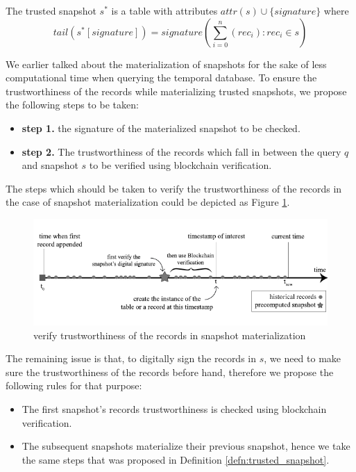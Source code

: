 			\begin{defn} 
				The trusted snapshot $s^*$ is a table with attributes $attr(s)\cup \{signature\}$ where $$tail(s^*[signature]) = signature(\sum_{i=0}^n (rec_i):rec_i \in s)$$
			\label{defn:trusted_snapshot}
			\end{defn}

			\begin{defn} 
				We earlier talked about the materialization of snapshots for the sake of less computational time when querying the temporal database. To ensure the trustworthiness of the records while materializing trusted snapshots, we propose the following steps to be taken:
				\begin{itemize}
					\item \textbf{step 1.} the signature of the materialized snapshot to be checked.
					\item \textbf{step 2.} The trustworthiness of the records which fall in between the query $q$ and snapshot $s$ to be verified using blockchain verification.
				\end{itemize}
				The steps which should be taken to verify the trustworthiness of the records in the case of snapshot materialization could be depicted as Figure \ref{fig:blockchain_snapshot_materialization}.
			\label{defn:trusted_snapshot}
			\end{defn}
			\begin{figure}
				\centering
				\includegraphics[width=\textwidth]{figs/trusted_snapshot_materialization.pdf}
				\caption{verify trustworthiness of the records in snapshot materialization}
				\label{fig:blockchain_snapshot_materialization}
			\end{figure}

			The remaining issue is that, to digitally sign the records in $s$, we need to make sure the trustworthiness of the records before hand, therefore we propose the following rules for that purpose:

			\begin{itemize}
				\item The first snapshot's records trustworthiness is checked using blockchain verification.
				\item The subsequent snapshots materialize their previous snapshot, hence we take the same steps that was proposed in Definition \ref{defn:trusted_snapshot}.
			\end{itemize}

